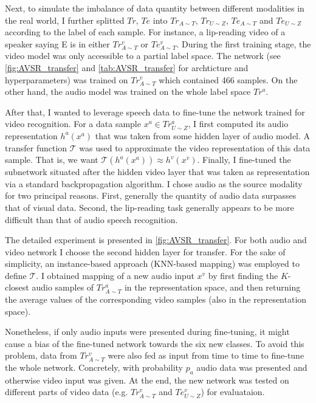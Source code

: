 Next, to simulate the imbalance of data quantity between different
modalities in the real world, I further splitted $Tr$, $Te$ into
$Tr_{A\sim T}$, $Tr_{U\sim Z}$, $Te_{A\sim T}$ and $Te_{U\sim Z}$
according to the label of each sample.
For instance, a lip-reading video of a speaker saying E is in either
$Tr_{A\sim T}^v$ or $Te_{A\sim T}^v$.
During the first training stage, the video model was only accessible
to a partial label space. The network (see \autoref{fig:AVSR_transfer}
and \autoref{tab:AVSR_transfer} for archticture and hyperparameters)
was trained on $Tr_{A\sim T}^v$ which contained 466 samples.
On the other hand, the audio model was trained on the whole
label space $Tr^a$.

After that, I wanted to leverage speech data to fine-tune the network
trained for video recognition. For a data sample $x^a\in Tr_{U\sim Z}^a$,
I first computed its audio representation $h^a(x^a)$ that was taken from
some hidden layer of audio model. A transfer function $\mathcal{T}$ was used
to approximate the video representation of this data sample.
That is, we want $\mathcal{T}(h^a(x^a))\approx h^v(x^v)$. Finally, I
fine-tuned the subnetwork situated after the hidden video layer that
was taken as representation via a standard backpropagation algorithm.
I chose audio as the source modality for two principal reasons.
First, generally the quantity of audio data surpasses that of visual
data. Second, the lip-reading task generally appears to be more
difficult than that of audio speech recognition.

The detailed experiment is presented in \autoref{fig:AVSR_transfer}.
For both audio and video network I choose the second hidden layer for
transfer. For the sake of simplicity, an instance-based approach
(KNN-based mapping) was employed to define $\mathcal{T}$.
I obtained mapping of a new audio
input $x^v$ by first finding the $K$-closest audio samples of
$Tr_{A\sim T}^a$ in the representation space, and then returning the
average values of the corresponding video samples
(also in the representation space).

Nonetheless, if only audio inputs were presented during fine-tuning, it
might cause a bias of the fine-tuned network towards the six new classes.
To avoid this problem, data from $Tr_{A\sim T}^v$ were also fed as input
from time to time to fine-tune the whole network. Concretely, with
probability $p_a$ audio data was presented and otherwise video input
was given. At the end, the new network was tested on different parts of
video data (e.g. $Tr_{A\sim T}^v$ and $Te_{U\sim Z}^v$) for evaluataion.

